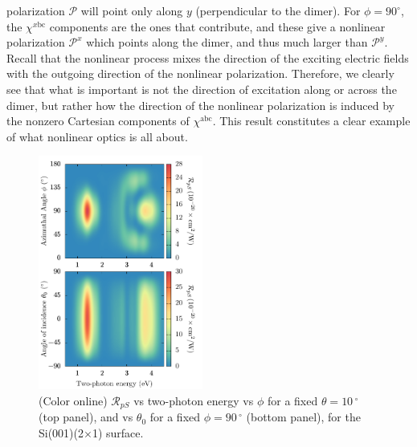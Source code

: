 \documentclass[aps,prb,10pt,showpacs,letterpaper,twocolumn]{revtex4-1}
\begin{document}
polarization $\boldsymbol{\mathcal{P}}$ will point only along $y$ (perpendicular
to the dimer). For $\phi=90^\circ$, the $\chi^{x\mathrm{bc}}$ components are the
ones that contribute, and these give a nonlinear polarization $\mathcal{P}^{x}$
which points along the dimer, and thus much larger than $\mathcal{P}^{y}$.
Recall that the nonlinear process mixes the direction of the exciting electric
fields with the outgoing direction of the nonlinear polarization. Therefore, we
clearly see that what is important is not the direction of excitation along or
across the dimer, but rather how the direction of the nonlinear polarization is
induced by the nonzero Cartesian components of $\chi^{\mathrm{abc}}$. This
result constitutes a clear example of what nonlinear optics is all about.

\begin{figure}[t]
\includegraphics[width=0.48\textwidth]{figures/fig6}
\caption{(Color online) $\mathcal{R}_{pS}$ vs two-photon energy vs $\phi$ for a
fixed $\theta = 10\,^{\circ}$ (top panel), and vs $\theta_{0}$ for a fixed $\phi
= 90\,^{\circ}$ (bottom panel), for the Si(001)(2$\times$1) surface.}
\label{fig:maps}
\end{figure}
\end{document}
